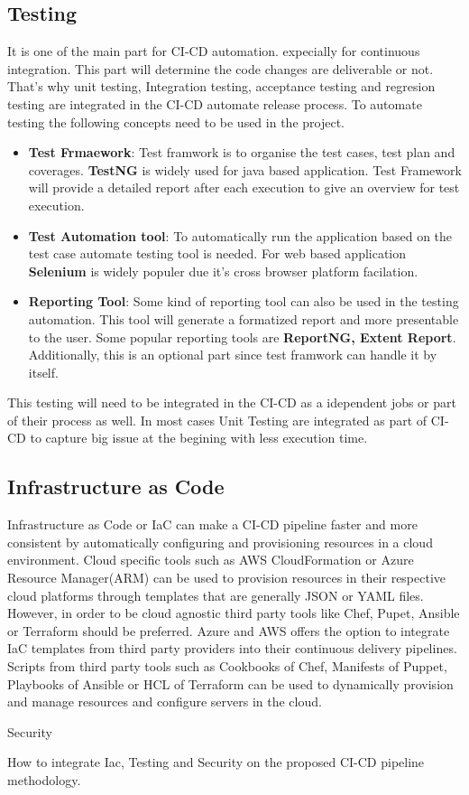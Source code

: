 \subsection{Testing}
It is one of the main part for CI-CD automation. expecially for continuous integration. This part will determine the code changes are deliverable or not. That's why unit testing, Integration testing, acceptance testing and regresion testing are integrated in the CI-CD automate release process. To automate testing the following concepts need to be used in the project.
\begin{itemize}
	\item \textbf{Test Frmaework}: Test framwork is to organise the test cases, test plan and coverages. \textbf{TestNG} is widely used for java based application. Test Framework will provide a detailed report after each execution to give an overview for test execution.
	\item \textbf{Test Automation tool}: To automatically run the application based on the test case automate testing tool is needed. For web based application \textbf{Selenium} is widely populer due it's cross browser platform facilation.
	\item \textbf{Reporting Tool}: Some kind of reporting tool can also be used in the testing automation. This tool will generate a formatized report and more presentable to the user. Some popular reporting tools are \textbf{ReportNG, Extent Report}. Additionally, this is an optional part since test framwork can handle it by itself.
\end{itemize}
This testing will need to be integrated in the CI-CD as a idependent jobs or part of their process as well. In most cases Unit Testing are integrated as part of CI-CD to capture big issue at the begining with less execution time.

\subsection{Infrastructure as Code}
Infrastructure as Code or IaC can make a CI-CD pipeline faster and more consistent by automatically configuring and provisioning resources in a cloud environment. Cloud specific tools such as AWS CloudFormation or Azure Resource Manager(ARM) can be used to provision resources in their respective cloud platforms through templates that are generally JSON or YAML files. However, in order to be cloud agnostic third party tools like Chef, Pupet, Ansible or Terraform should be preferred. Azure and AWS offers the option to integrate IaC templates  from third party providers into their continuous delivery pipelines. Scripts from third party tools such as Cookbooks of Chef, Manifests of Puppet, Playbooks of Ansible or HCL of Terraform can be used to dynamically provision and manage resources and configure servers in the cloud.

Security

How to integrate Iac, Testing and Security on the proposed CI-CD pipeline methodology.
